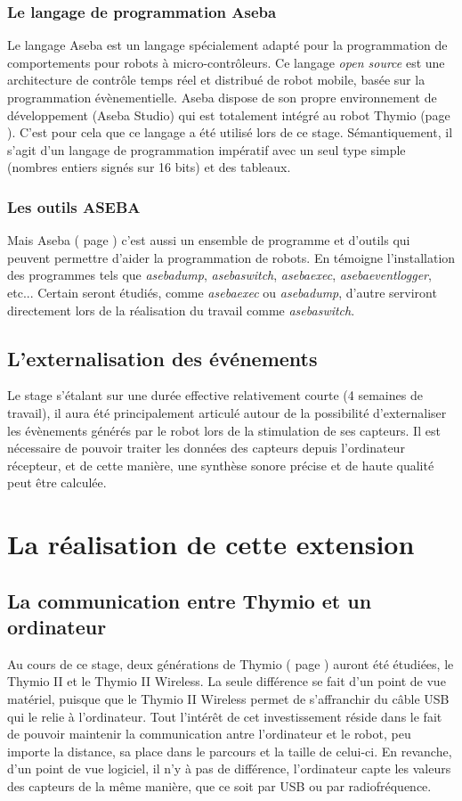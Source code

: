 \documentclass[a4paper, 12pt]{report}
\begin{document}
\subsection{Le langage de programmation Aseba }
\label{aseba}
Le langage Aseba \cite{ManualASEBA} est un langage spécialement adapté pour la programmation de comportements pour robots à micro-contrôleurs. Ce langage \textit{open source} est une architecture de contrôle temps réel et distribué de robot mobile, basée sur la programmation évènementielle. Aseba dispose de son propre environnement de développement (Aseba Studio) qui est totalement intégré au robot Thymio (page \pageref{thymio} ). C'est pour cela que ce langage a été utilisé lors de ce stage. Sémantiquement, il s'agit d'un langage de programmation impératif avec un seul type simple (nombres entiers signés sur 16 bits) et des tableaux.

\subsection{Les outils ASEBA}
Mais Aseba ( page \pageref{aseba} ) c'est aussi un ensemble de programme et d'outils qui peuvent permettre d'aider la programmation de robots. En témoigne l'installation des programmes tels que \textit{asebadump}, \textit{asebaswitch}, \textit{asebaexec}, \textit{asebaeventlogger}, etc...
Certain seront étudiés, comme \textit{asebaexec} ou \textit{asebadump}, d'autre serviront directement lors de la réalisation du travail comme \textit{asebaswitch}.

\section{L'externalisation des événements}
Le stage s'étalant sur une durée effective relativement courte (4 semaines de travail), il aura été principalement articulé autour de la possibilité d'externaliser les évènements générés par le robot lors de la stimulation de ses capteurs. Il est nécessaire de pouvoir traiter les données des capteurs depuis l'ordinateur récepteur, et de cette manière, une synthèse sonore précise et de haute qualité peut être calculée.

\chapter{La réalisation de cette extension}
\section{La communication entre Thymio et un ordinateur}
Au cours de ce stage, deux générations de Thymio ( page \pageref{thymio} ) auront été étudiées, le Thymio II et le Thymio II Wireless. La seule différence se fait d'un point de vue matériel, puisque que le Thymio II Wireless permet de s'affranchir du câble USB qui le relie à l'ordinateur. Tout l'intérêt de cet investissement réside dans le fait de pouvoir maintenir la communication antre l'ordinateur et le robot, peu importe la distance, sa place dans le parcours et la taille de celui-ci. En revanche, d'un point de vue logiciel, il n'y à pas de différence, l'ordinateur capte les valeurs des capteurs de la même manière, que ce soit par USB ou par radiofréquence.
\end{document}
